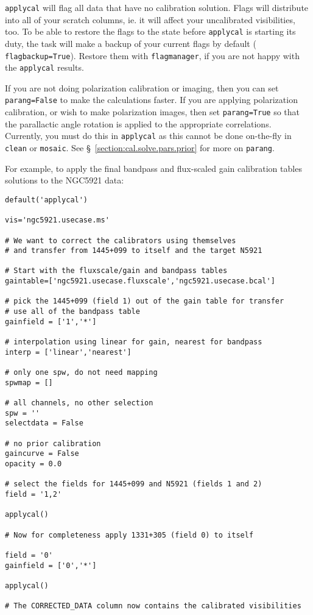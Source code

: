 {\tt applycal} will flag all data that have no calibration
solution. Flags will distribute into all of your scratch columns,
ie. it will affect your uncalibrated visibilities, too. To be able to
restore the flags to the state before {\tt applycal} is starting its
duty, the task will make a backup of your current flags by default ({\tt
  flagbackup=True}). Restore them with {\tt flagmanager}, if you are
not happy with the {\tt applycal} results.



If you are not doing polarization calibration or imaging, then you can set 
{\tt parang=False} to make the calculations faster.  If you are
applying polarization calibration, or wish to make polarization
images, then set {\tt parang=True} so that the parallactic angle
rotation is applied to the appropriate correlations.  Currently,
you must do this in {\tt applycal} as this cannot be done on-the-fly
in {\tt clean} or {\tt mosaic}.  
See \S~\ref{section:cal.solve.pars.prior} for more on {\tt parang}.


For example, to apply the final bandpass and flux-scaled gain
calibration tables solutions to the NGC5921 data:
\small
\begin{verbatim}
default('applycal')

vis='ngc5921.usecase.ms'

# We want to correct the calibrators using themselves
# and transfer from 1445+099 to itself and the target N5921

# Start with the fluxscale/gain and bandpass tables
gaintable=['ngc5921.usecase.fluxscale','ngc5921.usecase.bcal']
         
# pick the 1445+099 (field 1) out of the gain table for transfer
# use all of the bandpass table
gainfield = ['1','*']

# interpolation using linear for gain, nearest for bandpass
interp = ['linear','nearest']

# only one spw, do not need mapping
spwmap = []

# all channels, no other selection
spw = ''
selectdata = False

# no prior calibration
gaincurve = False
opacity = 0.0

# select the fields for 1445+099 and N5921 (fields 1 and 2)
field = '1,2'

applycal()

# Now for completeness apply 1331+305 (field 0) to itself

field = '0'
gainfield = ['0','*']

applycal()

# The CORRECTED_DATA column now contains the calibrated visibilities
\end{verbatim}
\normalsize

